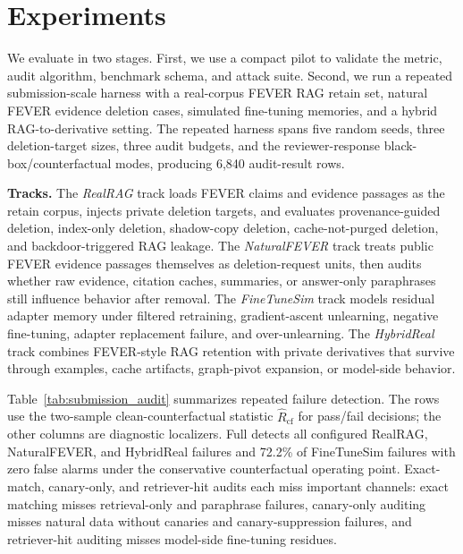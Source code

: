 \section{Experiments}

We evaluate \method{} in two stages. First, we use a compact pilot to validate the metric, audit algorithm, benchmark schema, and attack suite. Second, we run a repeated submission-scale harness with a real-corpus FEVER RAG retain set, natural FEVER evidence deletion cases, simulated fine-tuning memories, and a hybrid RAG-to-derivative setting. The repeated harness spans five random seeds, three deletion-target sizes, three audit budgets, and the reviewer-response black-box/counterfactual modes, producing 6,840 audit-result rows.

\textbf{Tracks.}
The \emph{RealRAG} track loads FEVER claims and evidence passages as the retain corpus, injects private deletion targets, and evaluates provenance-guided deletion, index-only deletion, shadow-copy deletion, cache-not-purged deletion, and backdoor-triggered RAG leakage. The \emph{NaturalFEVER} track treats public FEVER evidence passages themselves as deletion-request units, then audits whether raw evidence, citation caches, summaries, or answer-only paraphrases still influence behavior after removal. The \emph{FineTuneSim} track models residual adapter memory under filtered retraining, gradient-ascent unlearning, negative fine-tuning, adapter replacement failure, and over-unlearning. The \emph{HybridReal} track combines FEVER-style RAG retention with private derivatives that survive through examples, cache artifacts, graph-pivot expansion, or model-side behavior.



Table~\ref{tab:submission_audit} summarizes repeated failure detection. The \method{} rows use the two-sample clean-counterfactual statistic $\hat R_{\mathrm{cf}}$ for pass/fail decisions; the other columns are diagnostic localizers. Full \method{} detects all configured RealRAG, NaturalFEVER, and HybridReal failures and 72.2\% of FineTuneSim failures with zero false alarms under the conservative counterfactual operating point. Exact-match, canary-only, and retriever-hit audits each miss important channels: exact matching misses retrieval-only and paraphrase failures, canary-only auditing misses natural data without canaries and canary-suppression failures, and retriever-hit auditing misses model-side fine-tuning residues.

